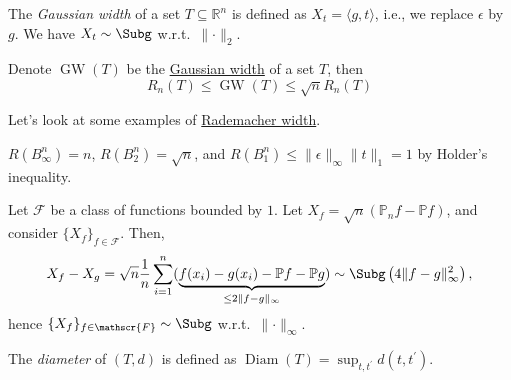 \begin{eg}\label{eg:Gaussian-width}
	The \emph{Gaussian width} of a set \(T \subseteq \mathbb{R} ^n\) is defined as \(X_t = \langle g, t \rangle \), i.e., we replace \(\epsilon \) by \(g\). We have \(X_t \sim \Subg\) w.r.t.\ \(\lVert \cdot \rVert _2\).
\end{eg}

\begin{theorem}
	Denote \(\mathop{\mathrm{GW}}(T) \) be the \hyperref[eg:Gaussian-width]{Gaussian width} of a set \(T\), then
	\[
		R_n(T) \leq \mathop{\mathrm{GW}}(T) \leq \sqrt{n} R_n(T)
	\]
\end{theorem}

Let's look at some examples of \hyperref[def:Rademacher-width]{Rademacher width}.

\begin{eg}
	\(R(B_\infty ^n) = n\), \(R(B_2^n)= \sqrt{n} \), and \(R(B_1^n) \leq \lVert \epsilon \rVert _\infty \lVert t \rVert _1 = 1\) by Holder's inequality.
\end{eg}

\begin{eg}
	Let \(\mathscr{F} \) be a class of functions bounded by \(1\). Let \(X_f = \sqrt{n} (\mathbb{P} _n f - \mathbb{P} f)\), and consider \(\{ X_f \}_{f\in \mathscr{F} } \). Then,
	\[
		X_f - X_g
		= \sqrt{n} \frac{1}{n}\sum_{i=1}^{n} ( \underbrace{f(x_i) - g(x_i) - \mathbb{P} f - \mathbb{P} g }_{\leq 2 \lVert f-g \rVert _\infty })
		\sim \Subg\left( 4 \lVert f - g \rVert _\infty ^2 \right) ,
	\]
	hence \(\{ X_f \} _{f\in \mathscr{F} } \sim \Subg\) w.r.t.\ \(\lVert \cdot \rVert _\infty \).
\end{eg}

\begin{definition}[Diameter]\label{def:diameter}
	The \emph{diameter} of \((T, d)\) is defined as \(\mathop{\mathrm{Diam}}(T) = \sup _{t, t^{\prime} } d(t, t^{\prime} )\).
\end{definition}

